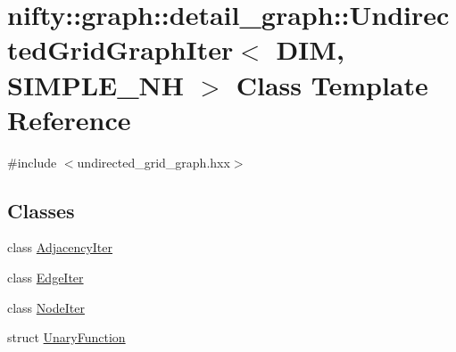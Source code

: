 \hypertarget{classnifty_1_1graph_1_1detail__graph_1_1UndirectedGridGraphIter}{}\section{nifty\+:\+:graph\+:\+:detail\+\_\+graph\+:\+:Undirected\+Grid\+Graph\+Iter$<$ D\+IM, S\+I\+M\+P\+L\+E\+\_\+\+NH $>$ Class Template Reference}
\label{classnifty_1_1graph_1_1detail__graph_1_1UndirectedGridGraphIter}


{\ttfamily \#include $<$undirected\+\_\+grid\+\_\+graph.\+hxx$>$}

\subsection*{Classes}
\begin{DoxyCompactItemize}
\item 
class \hyperlink{classnifty_1_1graph_1_1detail__graph_1_1UndirectedGridGraphIter_1_1AdjacencyIter}{Adjacency\+Iter}
\item 
class \hyperlink{classnifty_1_1graph_1_1detail__graph_1_1UndirectedGridGraphIter_1_1EdgeIter}{Edge\+Iter}
\item 
class \hyperlink{classnifty_1_1graph_1_1detail__graph_1_1UndirectedGridGraphIter_1_1NodeIter}{Node\+Iter}
\item 
struct \hyperlink{structnifty_1_1graph_1_1detail__graph_1_1UndirectedGridGraphIter_1_1UnaryFunction}{Unary\+Function}
\end{DoxyCompactItemize}
